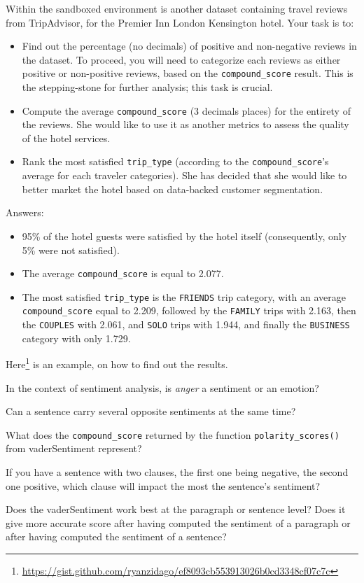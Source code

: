 	Within the sandboxed environment is another dataset containing travel reviews from TripAdvisor, for the Premier Inn London Kensington hotel. Your task is to:
	\begin{itemize}
		\item [1.] Find out the percentage (no decimals) of positive and non-negative reviews in the dataset. To proceed, you will need to categorize each reviews as either positive or non-positive reviews, based on the \verb|compound_score| result. This is the stepping-stone for further analysis; this task is crucial.
		\item [2.] Compute the average \verb|compound_score| (3 decimals places) for the entirety of the reviews. She would like to use it as another metrics to assess the quality of the hotel services. 
		\item [3.] Rank the most satisfied \verb|trip_type| (according to the \verb|compound_score|'s average for each traveler categories). She has decided that she would like to better market the hotel based on data-backed customer segmentation.
	\end{itemize}
	
	Answers:
	\begin{itemize}
		\item [1.] 95\% of the hotel guests were satisfied by the hotel itself (consequently, only 5\% were not satisfied).
		\item [2.] The average \verb|compound_score| is equal to 2.077.
		\item [3.] The most satisfied \verb|trip_type| is the \verb|FRIENDS| trip category, with an average \verb|compound_score| equal to 2.209, followed by the \verb|FAMILY| trips with 2.163, then the \verb|COUPLES| with 2.061, and \verb|SOLO| trips with 1.944, and finally the \verb|BUSINESS| category with only 1.729.
	\end{itemize}
	Here\footnote{\href{https://gist.github.com/ryanzidago/ef8093cb553913026b0cd3348cf07c7c}{https://gist.github.com/ryanzidago/ef8093cb553913026b0cd3348cf07c7c}} is an example, on how to find out the results.
	
	\begin{testquestion}
		\item [1.] In the context of sentiment analysis, is \textit{anger} a sentiment or an emotion?
		\item [2.] Can a sentence carry several opposite sentiments at the same time?
		\item [3.] What does the \verb|compound_score| returned by the function \verb|polarity_scores()| from vaderSentiment represent?
		\item [4.] If you have a sentence with two clauses, the first one being negative, the second one positive, which clause will impact the most the sentence's sentiment?
		\item [5.] Does the vaderSentiment work best at the paragraph or sentence level? Does it give more accurate score after having computed the sentiment of a paragraph or after having computed the sentiment of a sentence?
	\end{testquestion}

